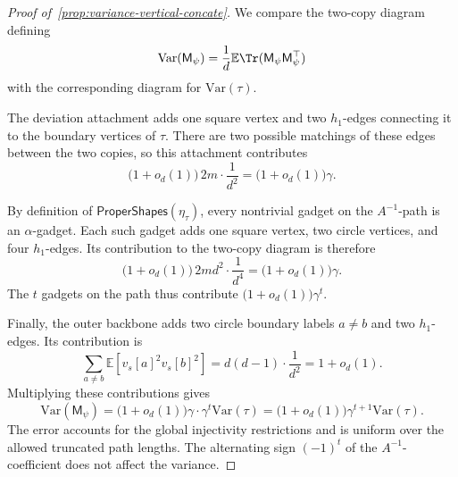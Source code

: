 \documentclass[12pt]{article}
\def \E {\mathbb{E}}
\newcommand{\Var}{\mathrm{Var}}
\newtheorem{proposition}[theorem]{Proposition}
\newcommand{\gam}{\gamma}
\newcommand{\cm}{\mathsf{M} }
\begin{document}
%

%
\begin{proof}[Proof of~\cref{prop:variance-vertical-concate}]
We compare the two-copy diagram defining
\[
    \Var(\cm_\psi)
    =
    \frac{1}{d}\E\Tr(\cm_\psi\cm_\psi^\top)
\]
with the corresponding diagram for \(\Var(\tau)\).

The deviation attachment adds one square vertex and two
\(h_1\)-edges connecting it to the boundary vertices of \(\tau\).
There are two possible matchings of these edges between the two
copies, so this attachment contributes
\[
    \bigl(1+o_d(1)\bigr)\,
    2m\cdot\frac{1}{d^2}
    =
    \bigl(1+o_d(1)\bigr)\gam.
\]

By definition of \(\mathsf{ProperShapes}(\eta_\tau)\), every
nontrivial gadget on the \(A^{-1}\)-path is an \(\alpha\)-gadget.
Each such gadget adds one square vertex, two circle vertices, and four
\(h_1\)-edges. Its contribution to the two-copy diagram is therefore
\[
    \bigl(1+o_d(1)\bigr)\,
    2m d^2\cdot\frac{1}{d^4}
    =
    \bigl(1+o_d(1)\bigr)\gam.
\]
The \(t\) gadgets on the path thus contribute
\(\bigl(1+o_d(1)\bigr)\gam^t\).

Finally, the outer backbone adds two circle boundary labels \(a\neq b\)
and two \(h_1\)-edges. Its contribution is
\[
    \sum_{a\neq b}
    \E\!\left[v_s[a]^2v_s[b]^2\right]
    =
    d(d-1)\cdot\frac{1}{d^2}
    =
    1+o_d(1).
\]
Multiplying these contributions gives
\[
    \Var(\cm_\psi)
    =
    \bigl(1+o_d(1)\bigr)
    \gam\cdot\gam^t\Var(\tau)
    =
    \bigl(1+o_d(1)\bigr)\gam^{t+1}\Var(\tau).
\]
The error accounts for the global injectivity restrictions and is
uniform over the allowed truncated path lengths. The alternating sign
\((-1)^t\) of the \(A^{-1}\)-coefficient does not affect the variance.
\end{proof}
\end{document}
